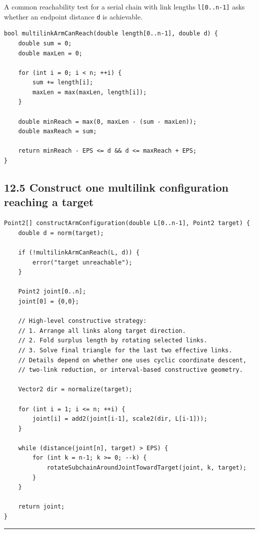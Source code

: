 \documentclass[11pt]{article}
\begin{document}
A common reachability test for a serial chain with link lengths
\texttt{l[0..n-1]} asks whether an endpoint distance
\texttt{d} is achievable.

\begin{verbatim}
bool multilinkArmCanReach(double length[0..n-1], double d) {
    double sum = 0;
    double maxLen = 0;

    for (int i = 0; i < n; ++i) {
        sum += length[i];
        maxLen = max(maxLen, length[i]);
    }

    double minReach = max(0, maxLen - (sum - maxLen));
    double maxReach = sum;

    return minReach - EPS <= d && d <= maxReach + EPS;
}
\end{verbatim}

\subsection{12.5 Construct one multilink configuration reaching a
target}\label{construct-one-multilink-configuration-reaching-a-target}

\begin{verbatim}
Point2[] constructArmConfiguration(double L[0..n-1], Point2 target) {
    double d = norm(target);

    if (!multilinkArmCanReach(L, d)) {
        error("target unreachable");
    }

    Point2 joint[0..n];
    joint[0] = {0,0};

    // High-level constructive strategy:
    // 1. Arrange all links along target direction.
    // 2. Fold surplus length by rotating selected links.
    // 3. Solve final triangle for the last two effective links.
    // Details depend on whether one uses cyclic coordinate descent,
    // two-link reduction, or interval-based constructive geometry.

    Vector2 dir = normalize(target);

    for (int i = 1; i <= n; ++i) {
        joint[i] = add2(joint[i-1], scale2(dir, L[i-1]));
    }

    while (distance(joint[n], target) > EPS) {
        for (int k = n-1; k >= 0; --k) {
            rotateSubchainAroundJointTowardTarget(joint, k, target);
        }
    }

    return joint;
}
\end{verbatim}

\begin{center}\rule{0.5\linewidth}{0.5pt}\end{center}
\end{document}

